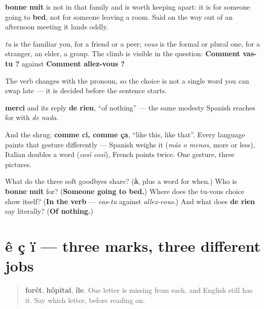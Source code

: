 \textbf{bonne nuit} is not in that family and is worth keeping apart: it is for someone going to \textbf{bed}, not for someone leaving a room. Said on the way out of an afternoon meeting it lands oddly.

\begin{grammarlens}[title={Grammar Lens: tu and vous, and where the choice actually shows}]
\emph{tu} is the familiar you, for a friend or a peer; \emph{vous} is the formal or plural one, for a stranger, an elder, a group. The climb is visible in the question: \textbf{Comment vas-tu ?} against \textbf{Comment allez-vous ?}

The verb changes with the pronoun, so the choice is not a single word you can swap late — it is decided before the sentence starts.
\end{grammarlens}

\begin{grammarlens}[title={What you've built — thanks, and the shrug}]
\textbf{merci} and its reply \textbf{de rien}, \textquotedblleft{}of nothing\textquotedblright{} — the same modesty Spanish reaches for with \emph{de nada}.

And the shrug: \textbf{comme ci, comme ça}, \textquotedblleft{}like this, like that\textquotedblright{}. Every language paints that gesture differently — Spanish weighs it (\emph{más o menos}, more or less), Italian doubles a word (\emph{così così}), French points twice. One gesture, three pictures.
\end{grammarlens}

\begin{tcolorbox}[breakable,colback=teal!4,colframe=teal!35!black,title={Before you move on}]
What do the three soft goodbyes share? (\textbf{à}, plus a word for when.) Who is \textbf{bonne nuit} for? (\textbf{Someone going to bed.}) Where does the tu-vous choice show itself? (\textbf{In the verb} — \emph{vas-tu} against \emph{allez-vous}.) And what does \textbf{de rien} say literally? (\textbf{Of nothing.})
\end{tcolorbox}
\section[ê ç ï]{ê ç ï — three marks, three different jobs}

\label{lesson:FR-R05-second-pass-three-marks}



\begin{quote}
\textbf{forêt}, \textbf{hôpital}, \textbf{île}. One letter is missing from each, and English still has it. Say which letter, before reading on.
\end{quote}

